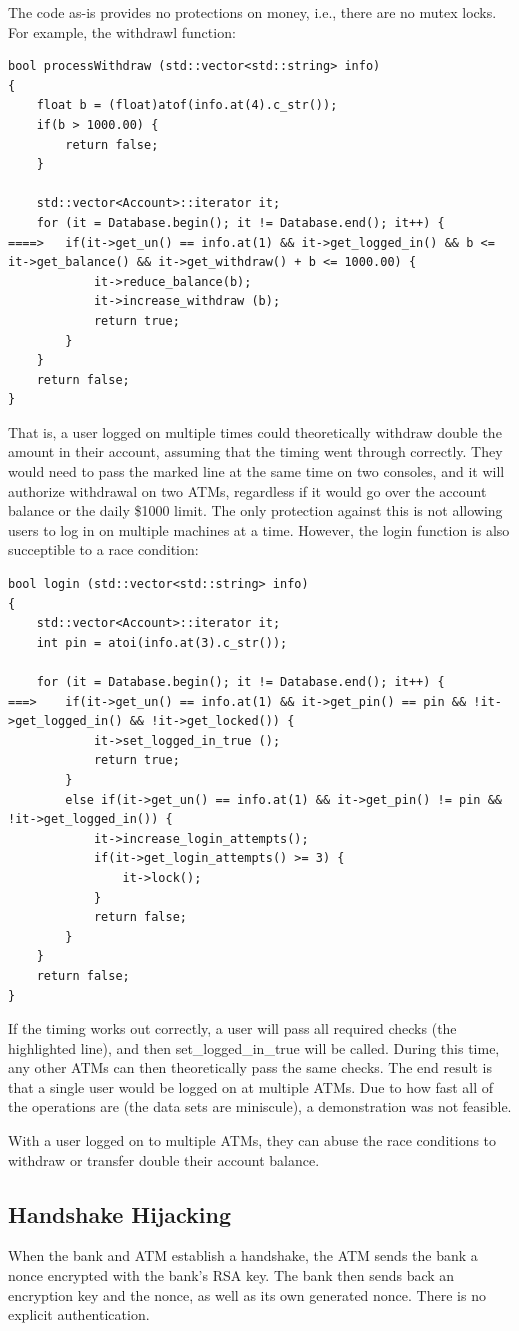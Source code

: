 \documentclass{article}
\begin{document}
The code as-is provides no protections on money, i.e., there are no mutex locks. For example, the withdrawl function:
\begin{lstlisting}
bool processWithdraw (std::vector<std::string> info)
{
	float b = (float)atof(info.at(4).c_str());
	if(b > 1000.00) {
		return false;
	}

	std::vector<Account>::iterator it;
	for (it = Database.begin(); it != Database.end(); it++) {
====>	if(it->get_un() == info.at(1) && it->get_logged_in() && b <= it->get_balance() && it->get_withdraw() + b <= 1000.00) {
			it->reduce_balance(b);
			it->increase_withdraw (b);
			return true;
		}
	}
	return false;
}
\end{lstlisting}
That is, a user logged on multiple times could theoretically withdraw double the amount in their account, assuming that the timing went through correctly. They would need to pass the marked line at the same time on two consoles, and it will authorize withdrawal on two ATMs, regardless if it would go over the account balance or the daily \$1000 limit. The only protection against this is not allowing users to log in on multiple machines at a time. However, the login function is also succeptible to a race condition:
\begin{lstlisting}
bool login (std::vector<std::string> info) 
{
	std::vector<Account>::iterator it;
	int pin = atoi(info.at(3).c_str());

	for (it = Database.begin(); it != Database.end(); it++) {
===>	if(it->get_un() == info.at(1) && it->get_pin() == pin && !it->get_logged_in() && !it->get_locked()) {
			it->set_logged_in_true ();
			return true;
		} 
		else if(it->get_un() == info.at(1) && it->get_pin() != pin && !it->get_logged_in()) {
			it->increase_login_attempts();
			if(it->get_login_attempts() >= 3) {
				it->lock();
			}
			return false;
		}
	}
	return false;
}
\end{lstlisting}
If the timing works out correctly, a user will pass all required checks (the highlighted line), and then set\_logged\_in\_true will be called. During this time, any other ATMs can then theoretically pass the same checks. The end result is that a single user would be logged on at multiple ATMs. Due to how fast all of the operations are (the data sets are miniscule), a demonstration was not feasible. 

With a user logged on to multiple ATMs, they can abuse the race conditions to withdraw or transfer double their account balance.

\subsection{Handshake Hijacking}
When the bank and ATM establish a handshake, the ATM sends the bank a nonce encrypted with the bank's RSA key. The bank then sends back an encryption key and the nonce, as well as its own generated nonce. There is no explicit authentication.
\end{document}
